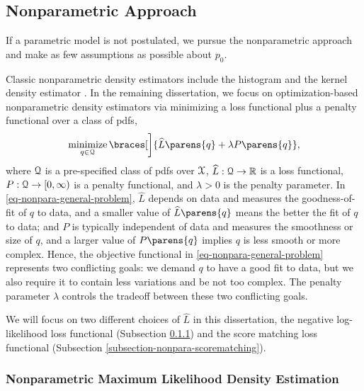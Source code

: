 \subsection{Nonparametric Approach}\label{section-nonparam-approach}

If a parametric model is not postulated, we pursue the nonparametric approach and make as few assumptions as possible about $p_0$. %

Classic nonparametric density estimators include the histogram \parencite[Section 6.2 in][]{Wasserman2006-lj} and the kernel density estimator \parencite[Section 6.3 in][]{Wasserman2006-lj}. In the remaining dissertation, we focus on optimization-based nonparametric density estimators via minimizing a loss functional plus a penalty functional over a class of pdfs, 
\begin{align}\label{eq-nonpara-general-problem} 
		\minimize_{q \in \calQ} \braces[\bigg]{ \widehat{L} \parens{q} + \lambda P \parens{q} }, 
\end{align}
where $\mathcal{Q}$ is a pre-specified class of pdfs over $\mathcal{X}$, $\widehat{L}: \mathcal{Q} \to \mathbb{R}$ is a loss functional, $P: \mathcal{Q} \to [0, \infty)$ is a penalty functional, and $\lambda > 0$ is the penalty parameter. In \eqref{eq-nonpara-general-problem}, $\widehat{L}$ depends on data and measures the goodness-of-fit of $q$ to data, and a smaller value of $\widehat{L} \parens{q}$ means the better the fit of $q$ to data; and $P$ is typically independent of data and measures the smoothness or size of $q$, and a larger value of $P \parens{q}$ implies $q$ is less smooth or more complex. Hence, the objective functional in \eqref{eq-nonpara-general-problem} represents two conflicting goals: we demand $q$ to have a good fit to data, but we also require it to contain less variations and be not too complex. The penalty parameter $\lambda$ controls the tradeoff between these two conflicting goals. 

We will focus on two different choices of $\widehat{L}$ in this dissertation, the negative log-likelihood loss functional (Subsection \ref{subsection-nonpara-mle}) and the score matching loss functional (Subsection \ref{subsection-nonpara-scorematching}). 

\subsubsection{Nonparametric Maximum Likelihood Density Estimation}\label{subsection-nonpara-mle}

